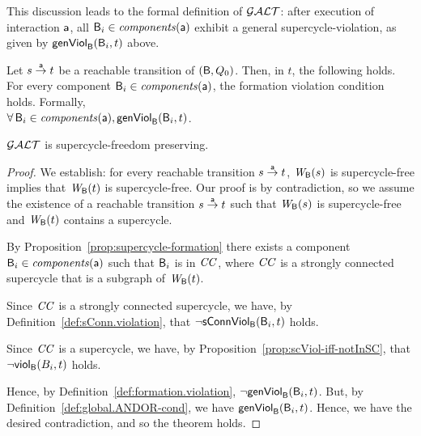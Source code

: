 
This discussion leads to the formal definition of $\GAO$: 
after execution of interaction $\act$, all $\B_i \in \cmps{\act}$ exhibit a general supercycle-violation, as given by $\genViol{\B_i}{t}$ above.

\begin{definition} \label{def:global.ANDOR-cond} \label{defn:global.ANDOR-cond} 
Let $s \goesto[\act] t$ be a reachable transition of $(\B, Q_0)$.
Then, in $t$, the following holds. 
For every component $\B_i \in \comps{\act}$, %
the formation violation condition holds.
Formally,\\
\ind  $\fas \B_i \in \comps{\act}, \genViol{\B_i}{t}$.
\end{definition}


\begin{theorem} \label{thm:GAO.SC-free-preserving}
$\GAO$ is supercycle-freedom preserving.
\end{theorem}
%
\begin{proof}
We establish:
for every reachable transition $s \la{\act} t$,
$\wfg{\B}{s}$ is supercycle-free implies that $\wfg{\B}{t}$ is
supercycle-free. Our proof is by contradiction, so we assume the existence of a reachable transition
$s \la{\act} t$ such that $\wfg{\B}{s}$ is supercycle-free and $\wfg{\B}{t}$ contains a supercycle.

By Proposition~\ref{prop:supercycle-formation}
 there exists a component $\B_i \in \cmps{\act}$ such that $\B_i$ is in $\CC$, where 
$\CC$ is a strongly connected supercycle that is a subgraph of $\wfg{\B}{t}$.

Since $\CC$ is a strongly connected supercycle, we have,
 by Definition~\ref{def:sConn.violation}, that $\neg \connViol{\B_i}{t}$ holds.

Since $\CC$ is a supercycle, we have, by Proposition~\ref{prop:scViol-iff-notInSC}, 
that $\neg \scV{B_i}{t}$ holds. %

Hence, by Definition~\ref{def:formation.violation}, $\neg \formViol{\B_i}{t}$.
But, by Definition~\ref{def:global.ANDOR-cond}, we have $\formViol{\B_i}{t}$.
Hence, we have the desired contradiction, and so the theorem holds.
\end{proof}


